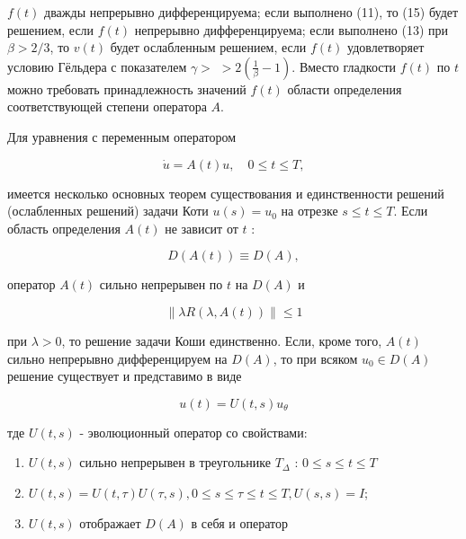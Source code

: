 \documentclass[10pt]{article}
\begin{document}
$f(t)$ дважды непрерывно дифференцируема; если выполнено (11), то (15) будет решением, если $f(t)$ непрерывно дифференцируема; если выполнено (13) при $\beta>2 / 3$, то $v(t)$ будет ослабленным решением, если $f(t)$ удовлетворяет условию Гёльдера с показателем $\gamma>$ $>2\left(\frac{1}{\beta}-1\right)$. Вместо гладкости $f(t)$ по $t$ можно требовать принадлежность значений $f(t)$ области определения соответствующей степени оператора $A$.



Для уравнения с переменным оператором



\[

\dot{u}=A(t) u, \quad 0 \leqslant t \leqslant T,

\]



имеется несколько основных теорем существования и единственности решений (ослабленных решений) задачи Коти $u(s)=u_{0}$ на отрезке $s \leqslant t \leqslant T$. Если область определения $A(t)$ не зависит от $t$ :



\[

D(A(t)) \equiv D(A),

\]



оператор $A(t)$ сильно непрерывен по $t$ на $D(A)$ и



\[

\|\lambda R(\lambda, A(t))\| \leqslant 1

\]



при $\lambda>0$, то решение задачи Коши единственно. Если, кроме того, $A(t)$ сильно непрерывно дифференцируем на $D(A)$, то при всяком $u_{0} \in D(A)$ решение существует и представимо в виде



\[

u(t)=U(t, s) u_{\theta}

\]



тде $U(t, s)$ - эволюционный оператор со свойствами:



\begin{enumerate}

  \item $U(t, s)$ сильно непрерывен в треугольнике $T_{\Delta}$ : $0 \leqslant s \leqslant t \leqslant T$



  \item $U(t, s)=U(t, \tau) U(\tau, s), 0 \leqslant s \leqslant \tau \leqslant t \leqslant T, U(s, s)=I$;



  \item $U(t, s)$ отображает $D(A)$ в себя и оператор



\end{enumerate}
\end{document}
